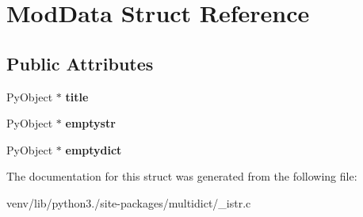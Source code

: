 \hypertarget{struct_mod_data}{}\section{Mod\+Data Struct Reference}
\label{struct_mod_data}
\subsection*{Public Attributes}
\begin{DoxyCompactItemize}
\item 
\mbox{\label{struct_mod_data_a08ceea19d9938162b11b06a14eeace4b}} 
Py\+Object $\ast$ {\bfseries title}
\item 
\mbox{\label{struct_mod_data_a465f70574a81a8944bf07396f5f859ce}} 
Py\+Object $\ast$ {\bfseries emptystr}
\item 
\mbox{\label{struct_mod_data_a97e44acce01b064658fee0403fef22a0}} 
Py\+Object $\ast$ {\bfseries emptydict}
\end{DoxyCompactItemize}


The documentation for this struct was generated from the following file\+:\begin{DoxyCompactItemize}
\item 
venv/lib/python3./site-\/packages/multidict/\+\_\+istr.\+c\end{DoxyCompactItemize}
